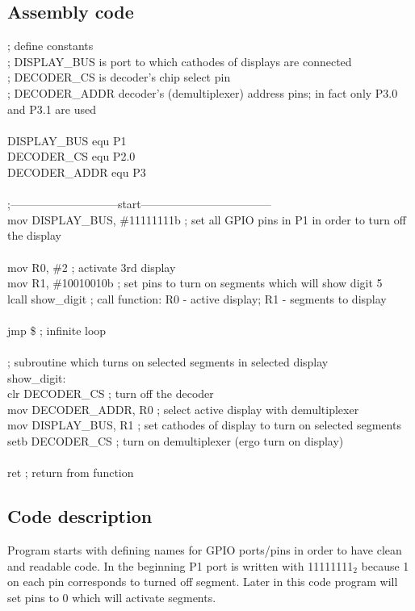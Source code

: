 \documentclass{article}
\begin{document}
\subsection{Assembly code}
\ttfamily
; define constants\\
; DISPLAY\_BUS is port to which cathodes of displays are connected\\
; DECODER\_CS is decoder's chip select pin\\
; DECODER\_ADDR decoder's (demultiplexer) address pins; in fact only P3.0 and P3.1 are used\\
\\
DISPLAY\_BUS     equ     P1\\
DECODER\_CS      equ     P2.0\\
DECODER\_ADDR    equ     P3\\
\\
;-----------------------------start-----------------------------------\\
    mov     DISPLAY\_BUS, \#11111111b ; set all GPIO pins in P1 in order to turn off the display\\
\\
    mov     R0, \#2                  ; activate 3rd display\\
    mov     R1, \#10010010b          ; set pins to turn on segments which will show digit 5\\
    lcall   show\_digit              ; call function: R0 - active display; R1 - segments to display\\
\\
    jmp     \$                       ; infinite loop\\
\\
; subroutine which turns on selected segments in selected display\\
show\_digit:\\
    clr     DECODER\_CS          ; turn off the decoder\\
    mov     DECODER\_ADDR, R0    ; select active display with demultiplexer\\
    mov     DISPLAY\_BUS, R1     ; set cathodes of display to turn on selected segments\\
    setb    DECODER\_CS          ; turn on demultiplexer (ergo turn on display)\\
\\
    ret                          ; return from function

\subsection{Code description}
\rmfamily
Program starts with defining names for GPIO ports/pins in order to have clean and readable
code. In the beginning P1 port is written with 11111111$_2$ because 1 on each pin corresponds
to turned off segment. Later in this code program will set pins to 0 which will activate segments.
\end{document}
